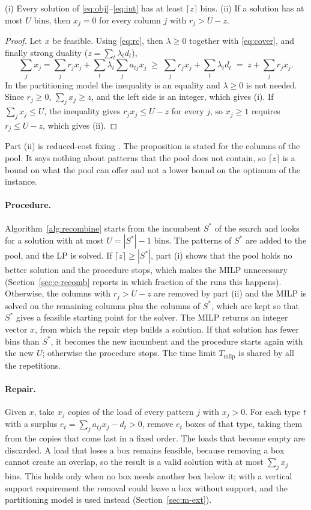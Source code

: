 \begin{proposition}
\label{prop:fix}
(i) Every solution of \eqref{eq:obj}--\eqref{eq:int} has at least $\lceil z\rceil$ bins.
(ii) If a solution has at most $U$ bins, then $x_j=0$ for every column $j$ with $r_j>U-z$.
\end{proposition}
\begin{proof}
Let $x$ be feasible. Using \eqref{eq:rc}, then $\lambda\ge 0$ together with \eqref{eq:cover}, and
finally strong duality ($z=\sum_t\lambda_t d_t$),
\[
\sum_j x_j=\sum_j r_j x_j+\sum_t\lambda_t\sum_j a_{tj}x_j\;\ge\;\sum_j r_j x_j+\sum_t\lambda_t d_t
\;=\;z+\sum_j r_j x_j .
\]
In the partitioning model the inequality is an equality and $\lambda\ge 0$ is not needed. Since
$r_j\ge 0$, $\sum_j x_j\ge z$, and the left side is an integer, which gives (i). If
$\sum_j x_j\le U$, the inequality gives $r_jx_j\le U-z$ for every $j$, so $x_j\ge 1$ requires
$r_j\le U-z$, which gives (ii).
\end{proof}

Part (ii) is reduced-cost fixing \citep{Wolsey1998}. The proposition is stated for the
columns of the pool. It says nothing about patterns that the pool does not contain, so $\lceil
z\rceil$ is a bound on what the pool can offer and not a lower bound on the optimum of the
instance.

\paragraph{Procedure.}
Algorithm~\ref{alg:recombine} starts from the incumbent $S^*$ of the search and looks for a
solution with at most $U=|S^*|-1$ bins. The patterns of $S^*$ are added to the pool, and the LP is
solved. If $\lceil z\rceil\ge|S^*|$, part (i) shows that the pool holds no better solution and
the procedure stops, which makes the MILP unnecessary
(Section~\ref{sec:e-recomb} reports in which fraction of the runs this happens). Otherwise, the
columns with $r_j>U-z$ are removed by part (ii) and the MILP is solved on the remaining columns
plus the columns of $S^*$, which are kept so that $S^*$ gives a feasible starting point for the
solver. The MILP returns an integer vector $x$, from which the repair step builds a solution. If
that solution has fewer bins than $S^*$, it becomes the new incumbent and the procedure starts
again with the new $U$; otherwise the procedure stops. The time limit $T_{\mathrm{milp}}$ is shared
by all the repetitions.

\paragraph{Repair.}
Given $x$, take $x_j$ copies of the load of every pattern $j$ with $x_j>0$. For each type $t$ with
a surplus $e_t=\sum_j a_{tj}x_j-d_t>0$, remove $e_t$ boxes of that type, taking them from the
copies that come last in a fixed order. The loads that become empty are discarded. A load that
loses a box remains feasible, because removing a box cannot create an overlap, so the result is a
valid solution with at most $\sum_j x_j$ bins. This holds only when no box needs another box below it;
with a vertical support requirement the removal could leave a box without support, and the
partitioning model is used instead (Section~\ref{sec:m-ext}).

